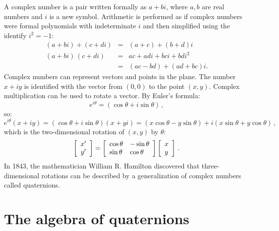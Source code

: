 \documentclass[11pt,a4paper]{report}
\begin{document}
A complex number is a pair written formally as $a+bi$, where $a,b$ are real numbers and $i$ is a new symbol. Arithmetic is performed as if complex numbers were formal polynomials with indeterminate $i$ and then simplified using the identify $i^2=-1$:
\begin{eqnarray*}
(a+bi) + (c+di) &=& (a+c) + (b+d)i\\
(a+bi)\,(c+di) &=& ac + adi + bci + bdi^2\\
&=&(ac-bd) + (ad+bc)i.
\end{eqnarray*}
Complex numbers can represent vectors and points in the plane. The number $x+iy$ is identified with the vector from $(0,0)$ to the point $(x,y)$. Complex multiplication can be used to rotate a vector. By Euler's formula:
\[
e^{i\theta} = (\cos\theta + i\sin\theta)\,,
\]
so:
\[
e^{i\theta}(x+iy) = (\cos\theta + i\sin\theta)(x+yi)
=(x\cos\theta - y\sin\theta) + i(x\sin\theta+y\cos\theta)\,,
\]
which is the two-dimensional rotation of $(x,y)$ by $\theta$:
\begin{displaymath}
\left[ 
\begin{array}{c} x'\\ y' \end{array}
\right] = 
\left[\begin{array}{l} \cos\theta \\ \sin\theta \end{array}\\
\begin{array}{l} -\sin\theta \\ \cos\theta \end{array}\\
\right]
\left[\begin{array}{l} x \\ y \end{array}\\
\right]\,.
\end{displaymath}
In 1843, the mathematician William R. Hamilton discovered that three-dimensional rotations can be described by a generalization of complex numbers called quaternions.

\section{The algebra of quaternions}
\end{document}
